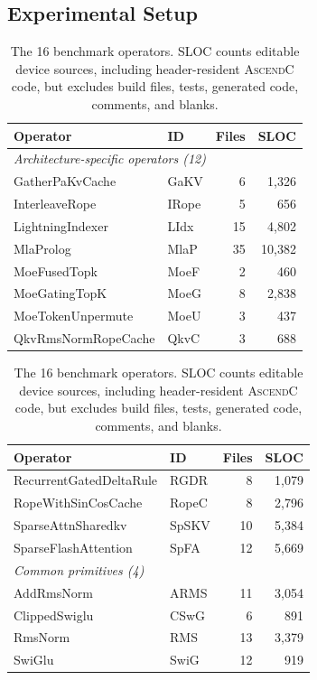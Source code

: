 \documentclass[acmsmall,screen,review,anonymous,nonacm]{acmart}
\newcommand{\ascendc}{\textsc{AscendC}\xspace}
\newcommand{\numkernels}{16\xspace}
\begin{document}
\subsection{Experimental Setup}

\begin{table}[!t]
  \centering
  \small
  \caption{The \numkernels benchmark operators. SLOC counts editable device sources, including
  header-resident \ascendc code, but excludes build files, tests, generated code, comments, and blanks.}
  \label{tab:benchmark-scale}
  \setlength{\tabcolsep}{3.5pt}
  \footnotesize
  \begin{minipage}[t]{0.485\textwidth}
    \begin{tabular}{llrr}
      \toprule
      Operator & ID & Files & SLOC \\
      \midrule
      \multicolumn{4}{l}{\itshape Architecture-specific operators (12)} \\
      GatherPaKvCache         & GaKV   & 6 & 1{,}326 \\
      InterleaveRope          & IRope  & 5 & 656 \\
      LightningIndexer        & LIdx   & 15 & 4{,}802 \\
      MlaProlog               & MlaP   & 35 & 10{,}382 \\
      MoeFusedTopk            & MoeF   & 2 & 460 \\
      MoeGatingTopK           & MoeG   & 8 & 2{,}838 \\
      MoeTokenUnpermute       & MoeU   & 3 & 437 \\
      QkvRmsNormRopeCache     & QkvC   & 3 & 688 \\
      \bottomrule
    \end{tabular}
  \end{minipage}\hfill
  \begin{minipage}[t]{0.485\textwidth}
    \begin{tabular}{llrr}
      \toprule
      Operator & ID & Files & SLOC \\
      \midrule
      RecurrentGatedDeltaRule & RGDR   & 8 & 1{,}079 \\
      RopeWithSinCosCache     & RopeC  & 8 & 2{,}796 \\
      SparseAttnSharedkv      & SpSKV  & 10 & 5{,}384 \\
      SparseFlashAttention    & SpFA   & 12 & 5{,}669 \\
      \multicolumn{4}{l}{\itshape Common primitives (4)} \\
      AddRmsNorm              & ARMS   & 11 & 3{,}054 \\
      ClippedSwiglu           & CSwG   & 6 & 891 \\
      RmsNorm                 & RMS    & 13 & 3{,}379 \\
      SwiGlu                  & SwiG   & 12 & 919 \\
      \bottomrule
    \end{tabular}
  \end{minipage}
\end{table}
\end{document}
